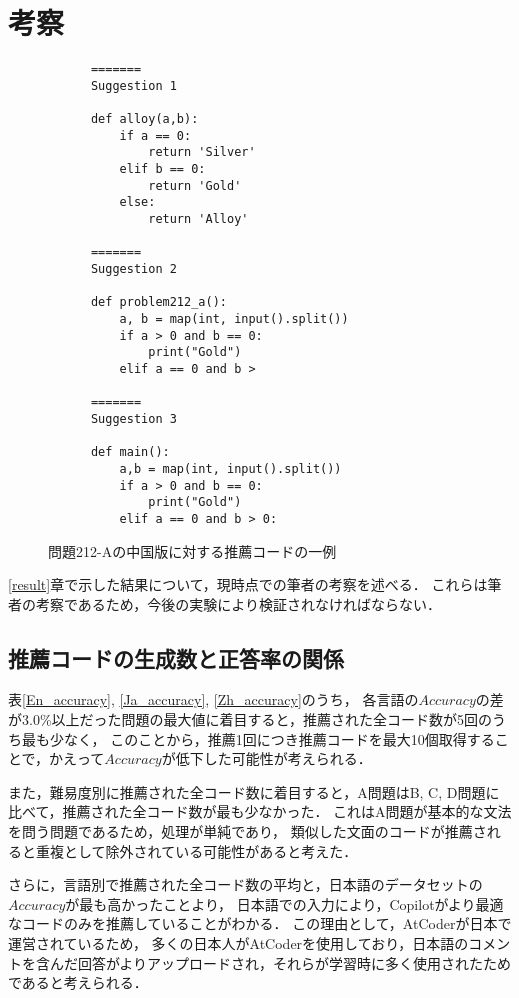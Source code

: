 \section{考察\label{discussion}}
  \begin{figure}[t]
    \begin{verbatim}
      =======
      Suggestion 1

      def alloy(a,b):
          if a == 0:
              return 'Silver'
          elif b == 0:
              return 'Gold'
          else:
              return 'Alloy'

      =======
      Suggestion 2

      def problem212_a():
          a, b = map(int, input().split())
          if a > 0 and b == 0:
              print("Gold")
          elif a == 0 and b >

      =======
      Suggestion 3

      def main():
          a,b = map(int, input().split())
          if a > 0 and b == 0:
              print("Gold")
          elif a == 0 and b > 0:
    \end{verbatim}
    \caption{問題212-Aの中国版に対する推薦コードの一例}
    \label{recommend_212_A_en}
  \end{figure}
  \ref{result}章で示した結果について，現時点での筆者の考察を述べる．
  これらは筆者の考察であるため，今後の実験により検証されなければならない．
  \vspace{-1zh}
  \subsection{推薦コードの生成数と正答率の関係}
  表\ref{En_accuracy}, \ref{Ja_accuracy}, \ref{Zh_accuracy}のうち，
  各言語の$Accuracy$の差が3.0\%以上だった問題の最大値に着目すると，推薦された全コード数が5回のうち最も少なく，
  このことから，推薦1回につき推薦コードを最大10個取得することで，かえって$Accuracy$が低下した可能性が考えられる．

  また，難易度別に推薦された全コード数に着目すると，A問題はB, C, D問題に比べて，推薦された全コード数が最も少なかった．
  これはA問題が基本的な文法を問う問題であるため，処理が単純であり，
  類似した文面のコードが推薦されると重複として除外されている可能性があると考えた．

  さらに，言語別で推薦された全コード数の平均と，日本語のデータセットの$Accuracy$が最も高かったことより，
  日本語での入力により，Copilotがより最適なコードのみを推薦していることがわかる．
  この理由として，AtCoder\cite{AtCoder}が日本で運営されているため，
  多くの日本人がAtCoderを使用しており，日本語のコメントを含んだ回答がよりアップロードされ，それらが学習時に多く使用されたためであると考えられる．
